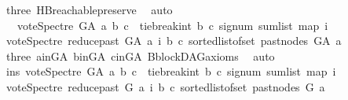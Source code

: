 \begin{isabellebody}
\ three\ HB{}{\isachardot}{\kern0pt}reachable{}{\isacharunderscore}{\kern0pt}preserve\ \isamarkupfalse%
\ auto\isanewline
\ \ \isamarkupfalse%
\ \isamarkupfalse%
\ \ {\isachardoublequoteopen}\ vote{\isacharunderscore}{\kern0pt}Spectre\ G{\isacharunderscore}{\kern0pt}A\ a\ b\ c\ {\isacharequal}{\kern0pt}\ {\isacharparenleft}{\kern0pt}tie{\isacharunderscore}{\kern0pt}break{\isacharunderscore}{\kern0pt}int\ b\ c\ {\isacharparenleft}{\kern0pt}signum\ {\isacharparenleft}{\kern0pt}sum{\isacharunderscore}{\kern0pt}list\ {\isacharparenleft}{\kern0pt}map\ {\isacharparenleft}{\kern0pt}{\isasymlambda}i{\isachardot}{\kern0pt}\isanewline
\ {\isacharparenleft}{\kern0pt}vote{\isacharunderscore}{\kern0pt}Spectre\ {\isacharparenleft}{\kern0pt}reduce{\isacharunderscore}{\kern0pt}past\ G{\isacharunderscore}{\kern0pt}A\ a{\isacharparenright}{\kern0pt}\ i\ b\ c{\isacharparenright}{\kern0pt}{\isacharparenright}{\kern0pt}\ {\isacharparenleft}{\kern0pt}sorted{\isacharunderscore}{\kern0pt}list{\isacharunderscore}{\kern0pt}of{\isacharunderscore}{\kern0pt}set\ {\isacharparenleft}{\kern0pt}past{\isacharunderscore}{\kern0pt}nodes\ G{\isacharunderscore}{\kern0pt}A\ a{\isacharparenright}{\kern0pt}{\isacharparenright}{\kern0pt}{\isacharparenright}{\kern0pt}{\isacharparenright}{\kern0pt}{\isacharparenright}{\kern0pt}{\isacharparenright}{\kern0pt}{\isachardoublequoteclose}\isanewline
\ \ \ \ \isamarkupfalse%
\ three\ a{\isacharunderscore}{\kern0pt}in{\isacharunderscore}{\kern0pt}G{\isacharunderscore}{\kern0pt}A\ b{\isacharunderscore}{\kern0pt}in{\isacharunderscore}{\kern0pt}G{\isacharunderscore}{\kern0pt}A\ c{\isacharunderscore}{\kern0pt}in{\isacharunderscore}{\kern0pt}G{\isacharunderscore}{\kern0pt}A\ B{}{\isachardot}{\kern0pt}blockDAG{\isacharunderscore}{\kern0pt}axioms\ \isamarkupfalse%
\ auto\isanewline
\ \ \isamarkupfalse%
\ \isamarkupfalse%
\ ins{\isacharunderscore}{\kern0pt}{}{\isacharcolon}{\kern0pt}\ {\isachardoublequoteopen}vote{\isacharunderscore}{\kern0pt}Spectre\ G{\isacharunderscore}{\kern0pt}A\ a\ b\ c\ {\isacharequal}{\kern0pt}\ {\isacharparenleft}{\kern0pt}tie{\isacharunderscore}{\kern0pt}break{\isacharunderscore}{\kern0pt}int\ b\ c\ {\isacharparenleft}{\kern0pt}signum\ {\isacharparenleft}{\kern0pt}sum{\isacharunderscore}{\kern0pt}list\ {\isacharparenleft}{\kern0pt}map\ {\isacharparenleft}{\kern0pt}{\isasymlambda}i{\isachardot}{\kern0pt}\isanewline
\ {\isacharparenleft}{\kern0pt}vote{\isacharunderscore}{\kern0pt}Spectre\ {\isacharparenleft}{\kern0pt}reduce{\isacharunderscore}{\kern0pt}past\ G\ a{\isacharparenright}{\kern0pt}\ i\ b\ c{\isacharparenright}{\kern0pt}{\isacharparenright}{\kern0pt}\ {\isacharparenleft}{\kern0pt}sorted{\isacharunderscore}{\kern0pt}list{\isacharunderscore}{\kern0pt}of{\isacharunderscore}{\kern0pt}set\ {\isacharparenleft}{\kern0pt}past{\isacharunderscore}{\kern0pt}nodes\ G\ a{\isacharparenright}{\kern0pt}{\isacharparenright}{\kern0pt}{\isacharparenright}{\kern0pt}{\isacharparenright}{\kern0pt}{\isacharparenright}{\kern0pt}{\isacharparenright}{\kern0pt}{\isachardoublequoteclose}\isanewline

\end{isabellebody}
